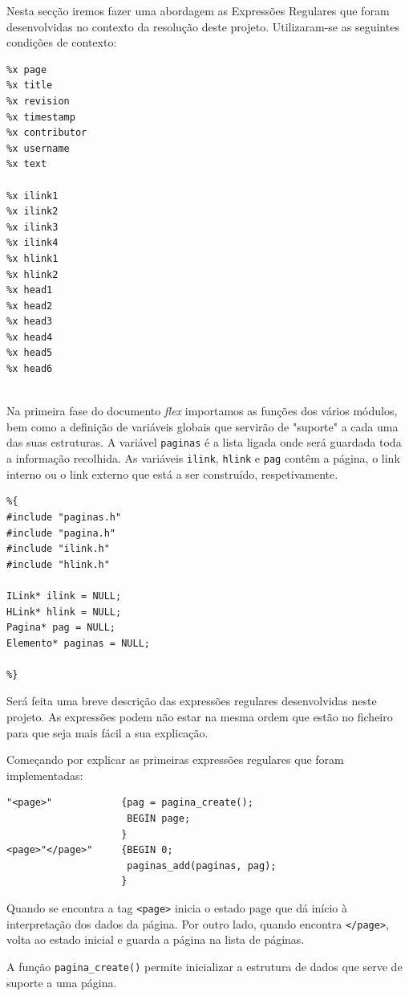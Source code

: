 \documentclass[11pt, a4paper, oneside]{article}
\begin{document}
Nesta secção iremos fazer uma abordagem as Expressões Regulares que foram desenvolvidas no contexto da resolução deste projeto. Utilizaram-se as seguintes condições de contexto:

\begin{verbatim}
%x page
%x title
%x revision
%x timestamp
%x contributor
%x username
%x text

%x ilink1
%x ilink2
%x ilink3
%x ilink4
%x hlink1
%x hlink2
%x head1
%x head2
%x head3
%x head4
%x head5
%x head6


\end{verbatim}


Na primeira fase do documento \emph{flex} importamos as funções dos vários módulos, bem como a definição de variáveis globais que servirão de "suporte" a cada uma das suas estruturas. A variável \texttt{paginas} é a lista ligada onde será guardada toda a informação recolhida. As variáveis \texttt{ilink}, \texttt{hlink} e \texttt{pag} contêm a página, o link interno ou o link externo que está a ser construído, respetivamente.

\begin{verbatim}
%{
#include "paginas.h"
#include "pagina.h"
#include "ilink.h"
#include "hlink.h"

ILink* ilink = NULL;
HLink* hlink = NULL;
Pagina* pag = NULL;
Elemento* paginas = NULL;

%}

\end{verbatim}
Será feita uma breve descrição das expressões regulares desenvolvidas neste projeto. As expressões podem não estar na mesma ordem que estão no ficheiro para que seja mais fácil a sua explicação.

Começando por explicar as primeiras expressões regulares que foram implementadas: 

\begin{verbatim}
"<page>"            {pag = pagina_create();
                     BEGIN page;
                    }
<page>"</page>"     {BEGIN 0;
                     paginas_add(paginas, pag);
                    }
\end{verbatim}

Quando se encontra a tag \texttt{<page>} inicia o estado page que dá início à interpretação dos dados da página. Por outro lado, quando encontra \texttt{</page>}, volta ao estado inicial e guarda a página na lista de páginas.

A função \texttt{pagina\_create()} permite inicializar a estrutura de dados que serve de suporte a uma página.
\end{document}
